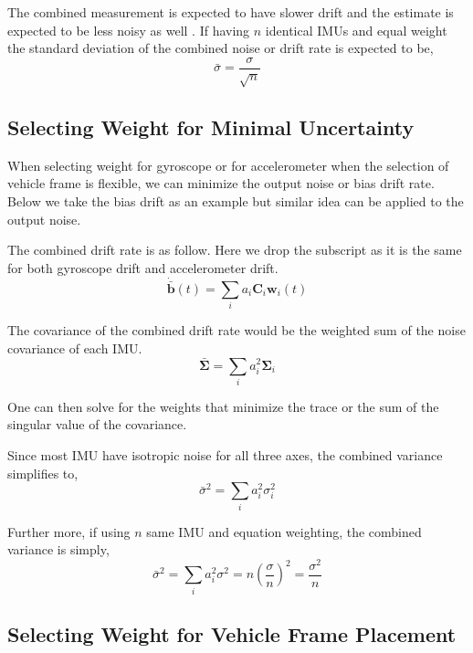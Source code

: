 \documentclass[conference]{IEEEtran}
\begin{document}
The combined measurement is expected to have slower drift and the estimate is expected to be less noisy as well \cite{patel2022_multi-imu}. If having $n$ identical IMUs and equal weight the standard deviation of the combined noise or drift rate is expected to be,
\begin{equation}
    \bar{\sigma} = \frac{\sigma}{\sqrt{n}}
\end{equation}

\subsection{Selecting Weight for Minimal Uncertainty}\label{solve_weight_by_noise}

When selecting weight for gyroscope or for accelerometer when the selection of vehicle frame is flexible, we can minimize the output noise or bias drift rate. Below we take the bias drift as an example but similar idea can be applied to the output noise.

The combined drift rate is as follow. Here we drop the subscript as it is the same for both gyroscope drift and accelerometer drift.
\begin{equation}
    \dot{\bar{\textbf{b}}}(t) = \sum_i{a_i \textbf{C}_i \textbf{w}_i(t)}
\end{equation}

The covariance of the combined drift rate would be the weighted sum of the noise covariance of each IMU.
\begin{equation}
    \bar{\bm{\Sigma}} = \sum_i{a_i^2 \bm{\Sigma}_i}
\end{equation}

One can then solve for the weights that minimize the trace or the sum of the singular value of the covariance.

Since most IMU have isotropic noise for all three axes, the combined variance simplifies to,
\begin{equation}\label{noise_reduction_asym}
    \bar{\sigma}^2 = \sum_i{a_i^2 \sigma_i^2}
\end{equation}

Further more, if using $n$ same IMU and equation weighting, the combined variance is simply,
\begin{equation}\label{noise_reduction_sym}
    \bar{\sigma}^2 = \sum_i{a_i^2 \sigma^2} = n \left(\frac{\sigma}{n}\right)^2 = \frac{\sigma^2}{n}
\end{equation}


\subsection{Selecting Weight for Vehicle Frame Placement}
\end{document}
